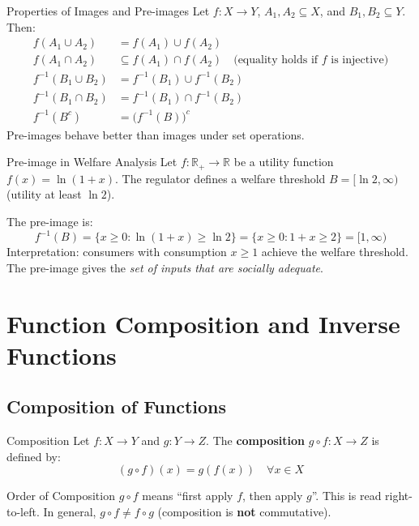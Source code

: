 \documentclass[12pt, a4paper]{article}
\theoremstyle{definition}
\newcommand{\R}{\mathbb{R}}
\begin{document}
\begin{thmbox}{Properties of Images and Pre-images}
Let $f: X \to Y$, $A_1, A_2 \subseteq X$, and $B_1, B_2 \subseteq Y$. Then:
\begin{align*}
  f(A_1 \cup A_2) &= f(A_1) \cup f(A_2) \\
  f(A_1 \cap A_2) &\subseteq f(A_1) \cap f(A_2) \quad \text{(equality holds if $f$ is injective)}\\
  f^{-1}(B_1 \cup B_2) &= f^{-1}(B_1) \cup f^{-1}(B_2) \\
  f^{-1}(B_1 \cap B_2) &= f^{-1}(B_1) \cap f^{-1}(B_2) \\
  f^{-1}(B^c) &= \bigl(f^{-1}(B)\bigr)^c
\end{align*}
Pre-images behave better than images under set operations.
\end{thmbox}

\begin{exbox}{Pre-image in Welfare Analysis}
Let $f: \R_+ \to \R$ be a utility function $f(x) = \ln(1+x)$. The regulator defines a welfare threshold $B = [\ln 2, \infty)$ (utility at least $\ln 2$).

The pre-image is:
\[
  f^{-1}(B) = \{x \geq 0 : \ln(1+x) \geq \ln 2\} = \{x \geq 0 : 1+x \geq 2\} = [1, \infty)
\]
Interpretation: consumers with consumption $x \geq 1$ achieve the welfare threshold. The pre-image gives the \emph{set of inputs that are socially adequate}.
\end{exbox}


\newpage %
\section{Function Composition and Inverse Functions}

\subsection{Composition of Functions}

\begin{defbox}{Composition}
Let $f: X \to Y$ and $g: Y \to Z$. The \textbf{composition} $g \circ f: X \to Z$ is defined by:
\[
  (g \circ f)(x) = g(f(x)) \quad \forall x \in X
\]
\end{defbox}

\begin{warnbox}{Order of Composition}
$g \circ f$ means ``first apply $f$, then apply $g$''. This is read right-to-left. In general, $g \circ f \neq f \circ g$ (composition is \textbf{not} commutative).
\end{warnbox}
\end{document}
